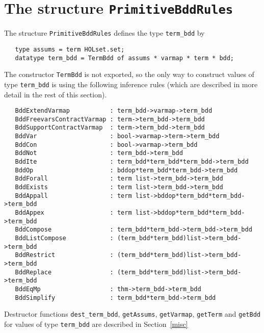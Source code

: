 \documentclass[12pt]{article}
\newcommand{\tyind}[1]{\index[MLty]{\texttt{#1}}}
\renewcommand{\t}[1]{\mbox{\tt #1}}
\newcommand{\ml}[1]{{\tt #1}}
\newcommand\termbddty{\texttt{term\_bdd}\xspace}
\begin{document}
\section{The structure \t{PrimitiveBddRules}}\label{PrimitiveBddRules}

The structure \ml{PrimitiveBddRules} defines the type \termbddty{} by

\vspace*{-2mm}

\begin{verbatim}
   type assums = term HOLset.set;
   datatype term_bdd = TermBdd of assums * varmap * term * bdd;
\end{verbatim}\tyind{term\_bdd}\tyind{assums}

\vspace*{-2mm}

The constructor \t{TermBdd} is not exported, so the only way to construct
values of type \termbddty is using the following inference rules
(which are described in more detail in the rest of this section).

{\footnotesize\begin{verbatim}
   BddExtendVarmap           : term_bdd->varmap->term_bdd
   BddFreevarsContractVarmap : term->term_bdd->term_bdd
   BddSupportContractVarmap  : term->term_bdd->term_bdd
   BddVar                    : bool->varmap->term->term_bdd
   BddCon                    : bool->varmap->term_bdd
   BddNot                    : term_bdd->term_bdd
   BddIte                    : term_bdd*term_bdd*term_bdd->term_bdd
   BddOp                     : bddop*term_bdd*term_bdd->term_bdd
   BddForall                 : term list->term_bdd->term_bdd
   BddExists                 : term list->term_bdd->term_bdd
   BddAppall                 : term list->bddop*term_bdd*term_bdd->term_bdd
   BddAppex                  : term list->bddop*term_bdd*term_bdd->term_bdd
   BddCompose                : term_bdd*term_bdd->term_bdd->term_bdd
   BddListCompose            : (term_bdd*term_bdd)list->term_bdd->term_bdd
   BddRestrict               : (term_bdd*term_bdd)list->term_bdd->term_bdd
   BddReplace                : (term_bdd*term_bdd)list->term_bdd->term_bdd
   BddEqMp                   : thm->term_bdd->term_bdd
   BddSimplify               : term_bdd*term_bdd->term_bdd
\end{verbatim}}

Destructor functions \t{dest\_term\_bdd}, \t{getAssums}, \t{getVarmap}, \t{getTerm}
and \t{getBdd} for values of type \termbddty are described in Section~\ref{misc}
\end{document}
